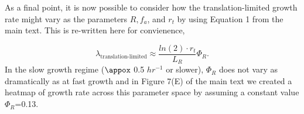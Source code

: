 As a final point, it is now possible to consider how the translation-limited
growth rate  might vary as the parameters $R, f_a$, and $r_t$ by using Equation
1 from the main text. This is re-written here for convienence,

\begin{equation}
\lambda_{\textrm{translation-limited}} \approx \frac{ln(2) \cdot r_t}{L_R}  \Phi_R.
\end{equation}
In the slow growth regime ($\appox$ 0.5 $hr^{-1}$ or slower), $\Phi_R$ does not
vary as dramatically as at fast growth and  in Figure 7(E) of the main text we
created a heatmap of growth rate across this parameter space by assuming a
constant value $\Phi_R$=0.13.
